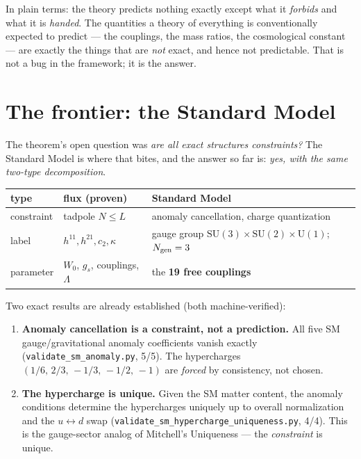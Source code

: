 \documentclass[11pt]{article}
\begin{document}
In plain terms: the theory predicts nothing exactly except what it \emph{forbids} and
what it is \emph{handed}. The quantities a theory of everything is conventionally
expected to predict --- the couplings, the mass ratios, the cosmological constant ---
are exactly the things that are \emph{not} exact, and hence not predictable. That is
not a bug in the framework; it is the answer.

\section{The frontier: the Standard Model}

The theorem's open question was \emph{are all exact structures constraints?} The
Standard Model is where that bites, and the answer so far is: \emph{yes, with the same
two-type decomposition}.

\begin{center}
\begin{tabular}{lll}
\toprule
type & flux (proven) & Standard Model \\
\midrule
constraint & tadpole $N\le L$ & anomaly cancellation, charge quantization \\
label & $h^{11},h^{21},c_2,\kappa$ & gauge group $\mathrm{SU}(3)\!\times\!\mathrm{SU}(2)\!\times\!\mathrm{U}(1)$; $N_{\rm gen}=3$ \\
parameter & $W_0$, $g_s$, couplings, $\Lambda$ & the \textbf{19 free couplings} \\
\bottomrule
\end{tabular}
\end{center}

Two exact results are already established (both machine-verified):

\begin{enumerate}
\item \textbf{Anomaly cancellation is a constraint, not a prediction.} All five SM
gauge/gravitational anomaly coefficients vanish exactly
(\texttt{validate\_sm\_anomaly.py}, 5/5). The hypercharges
$(1/6,\,2/3,\,-1/3,\,-1/2,\,-1)$ are \emph{forced} by consistency, not chosen.
\item \textbf{The hypercharge is unique.} Given the SM matter content, the anomaly
conditions determine the hypercharges uniquely up to overall normalization and the
$u\leftrightarrow d$ swap (\texttt{validate\_sm\_hypercharge\_uniqueness.py}, 4/4).
This is the gauge-sector analog of Mitchell's Uniqueness --- the \emph{constraint} is
unique.
\end{enumerate}
\end{document}
